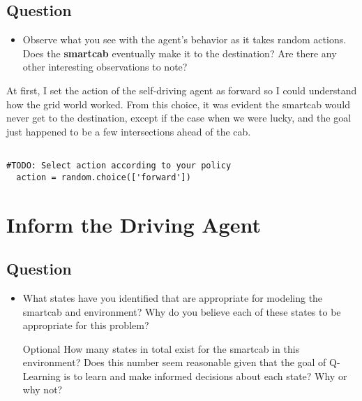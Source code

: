 \documentclass[twoside,openright,titlepage,numbers=noenddot,headinclude,%
               footinclude=true,cleardoublepage=empty,abstractoff,BCOR=5mm,%
               paper=a4,fontsize=11pt,ngerman,american]{scrreprt}
\numberwithin{theorem}{chapter}
\numberwithin{definition}{chapter}
\numberwithin{algorithm}{chapter}
\numberwithin{figure}{chapter}
\numberwithin{table}{chapter}
\numberwithin{equation}{chapter}
\begin{document}
\section*{Question}

\begin{itemize}
\item Observe what you see with the agent's behavior as it takes random actions. Does the \textbf{smartcab} eventually make it to the destination? Are there any other interesting observations to note?
\end{itemize}




 


At first, I set the action of the self-driving agent as forward so I could understand how the grid world worked. From this choice, it was evident the smartcab would never get to the destination, except if the case when we were lucky, and the goal just happened to be a few intersections ahead of the cab.
\begin{verbatim}

#TODO: Select action according to your policy
  action = random.choice(['forward'])

\end{verbatim}

%
%

\chapter*{Inform the Driving Agent}

\section*{Question}

\begin{itemize}
\item What states have you identified that are appropriate for modeling the smartcab and environment? Why do you believe each of these states to be appropriate for this problem?

\item [Optional] How many states in total exist for the smartcab in this environment? Does this number seem reasonable given that the goal of Q-Learning is to learn and make informed decisions about each state? Why or why not?
\end{itemize}
\end{document}
